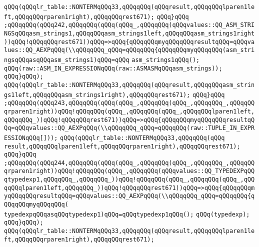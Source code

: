 \verb|qQQq(qQQqlr_table::NONTERMqQQq33,qQQqqQQq(qQQqresult,qQQqqQQqlparen1left,qQQqqQQqrparen1right),qQQqqQQqrest671);|\newline
\verb|qQQq}qQQq|\newline
\verb|;qQQqqQQq(qQQq242,qQQqqQQq(qQQq(qQQq_,qQQqqQQq(qQQqvalues::QQ_ASM_STRINGSqQQqasm_strings1,qQQqqQQqasm_strings1left,qQQqqQQqasm_strings1right))qQQq!qQQqqQQqrest671))qQQq=>qQQq{qQQqqQQqmyqQQqqQQqresultqQQq=qQQqvalues::QQ_AEXPqQQq(\\qQQqqQQq_qQQq=qQQqqQQq{qQQqqQQqmyqQQqqQQq(asm_stringsqQQqasqQQqasm_strings1)qQQq=qQQq|\newline
\verb|asm_strings1qQQq();|\newline
\verb|qQQq(raw::ASM_IN_EXPRESSIONqQQq(raw::ASMASMqQQqasm_strings));|\newline
\verb|qQQq}qQQq);|\newline
\verb|qQQq(qQQqlr_table::NONTERMqQQq33,qQQqqQQq(qQQqresult,qQQqqQQqasm_strings1left,qQQqqQQqasm_strings1right),qQQqqQQqrest671);|\newline
\verb|qQQq}qQQq|\newline
\verb|;qQQqqQQq(qQQq243,qQQqqQQq(qQQq(qQQq_,qQQqqQQq(qQQq_,qQQqqQQq_,qQQqqQQqrparen1right))qQQq!qQQqqQQq(qQQq_,qQQqqQQq(qQQq_,qQQqqQQqlparen1left,qQQqqQQq_))qQQq!qQQqqQQqrest671))qQQq=>qQQq{qQQqqQQqmyqQQqqQQqresultqQQq=qQQqvalues::QQ_AEXPqQQq(\\qQQqqQQq_qQQq=qQQqqQQq(raw::TUPLE_IN_EXPRESSIONqQQq[]));|\newline
\verb|qQQq(qQQqlr_table::NONTERMqQQq33,qQQqqQQq(qQQq|\newline
\verb|result,qQQqqQQqlparen1left,qQQqqQQqrparen1right),qQQqqQQqrest671);|\newline
\verb|qQQq}qQQq|\newline
\verb|;qQQqqQQq(qQQq244,qQQqqQQq(qQQq(qQQq_,qQQqqQQq(qQQq_,qQQqqQQq_,qQQqqQQqrparen1right))qQQq!qQQqqQQq(qQQq_,qQQqqQQq(qQQqvalues::QQ_TYPEDEXPqQQqtypedexp1,qQQqqQQq_,qQQqqQQq_))qQQq!qQQqqQQq(qQQq_,qQQqqQQq(qQQq_,qQQqqQQqlparen1left,qQQqqQQq_))qQQq!qQQqqQQqrest671))qQQq=>qQQq{qQQqqQQqmyqQQqqQQqresultqQQq=qQQqvalues::QQ_AEXPqQQq(\\qQQqqQQq_qQQq=qQQqqQQq{qQQqqQQqmyqQQqqQQq(|\newline
\verb|typedexpqQQqasqQQqtypedexp1)qQQq=qQQqtypedexp1qQQq();|\newline
\verb|qQQq(typedexp);|\newline
\verb|qQQq}qQQq);|\newline
\verb|qQQq(qQQqlr_table::NONTERMqQQq33,qQQqqQQq(qQQqresult,qQQqqQQqlparen1left,qQQqqQQqrparen1right),qQQqqQQqrest671);|\newline
